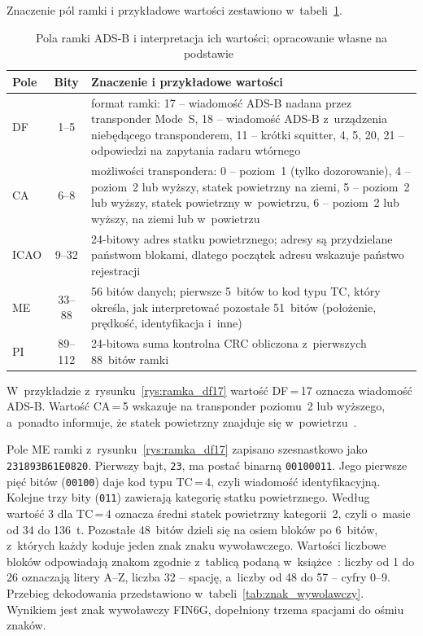 \newpage
Znaczenie pól ramki i przykładowe wartości zestawiono w~tabeli~\ref{tab:pola_ramki}.
\begin{table}[H]
  \centering
  \caption{Pola ramki ADS-B i interpretacja ich wartości; opracowanie własne na podstawie~\cite{sun2021}}
  \label{tab:pola_ramki}
  \small
  \begin{tabular}{@{}lcp{10.2cm}@{}}
    \toprule
    Pole & Bity & Znaczenie i przykładowe wartości \\
    \midrule
    DF & 1--5 & format ramki: 17 -- wiadomość ADS-B nadana przez transponder Mode~S, 18 -- wiadomość ADS-B z~urządzenia niebędącego transponderem, 11 -- krótki squitter, 4, 5, 20, 21 -- odpowiedzi na zapytania radaru wtórnego \\
    CA & 6--8 & możliwości transpondera: 0 -- poziom~1 (tylko dozorowanie), 4 -- poziom~2 lub wyższy, statek powietrzny na ziemi, 5 -- poziom~2 lub wyższy, statek powietrzny w~powietrzu, 6 -- poziom~2 lub wyższy, na ziemi lub w~powietrzu \\
    ICAO & 9--32 & 24-bitowy adres statku powietrznego; adresy są przydzielane państwom blokami, dlatego początek adresu wskazuje państwo rejestracji \\
    ME & 33--88 & 56 bitów danych; pierwsze 5~bitów to kod typu TC, który określa, jak interpretować pozostałe 51~bitów (położenie, prędkość, identyfikacja i~inne) \\
    PI & 89--112 & 24-bitowa suma kontrolna CRC obliczona z~pierwszych 88~bitów ramki \\
    \bottomrule
  \end{tabular}
\end{table}
W~przykładzie z~rysunku~\ref{rys:ramka_df17} wartość DF\,=\,17 oznacza wiadomość ADS-B. Wartość CA\,=\,5 wskazuje na transponder poziomu~2 lub wyższego, a~ponadto informuje, że statek powietrzny znajduje się w~powietrzu~\cite{sun2021}.

Pole ME ramki z~rysunku~\ref{rys:ramka_df17} zapisano szesnastkowo jako \texttt{231893B61E0820}. Pierwszy bajt, \texttt{23}, ma postać binarną \texttt{00100011}. Jego pierwsze pięć bitów (\texttt{00100}) daje kod typu TC\,=\,4, czyli wiadomość identyfikacyjną. Kolejne trzy bity (\texttt{011}) zawierają kategorię statku powietrznego. Według~\cite{sun2021} wartość 3 dla TC\,=\,4 oznacza średni statek powietrzny kategorii~2, czyli o~masie od 34 do 136~t. Pozostałe 48~bitów dzieli się na osiem bloków po 6~bitów, z~których każdy koduje jeden znak znaku wywoławczego. Wartości liczbowe bloków odpowiadają znakom zgodnie z~tablicą podaną  w~książce~\cite{sun2021}: liczby od 1 do 26 oznaczają litery A--Z, liczba 32 -- spację, a~liczby od 48 do 57 -- cyfry 0--9. Przebieg dekodowania przedstawiono w~tabeli~\ref{tab:znak_wywolawczy}. Wynikiem jest znak wywoławczy FIN6G, dopełniony trzema spacjami do ośmiu znaków.

